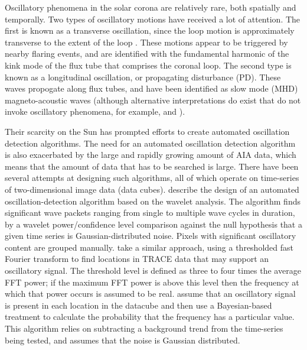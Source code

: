 \documentclass{aastex}
\begin{document}
Oscillatory phenomena in the solar corona are relatively rare, both
spatially and temporally.  Two types of oscillatory motions have
received a lot of attention.  The first is known as a transverse
oscillation, since the loop motion is approximately transverse to the
extent of the loop \citep{1999Sci...285..862N}.  These motions appear
to be triggered by nearby flaring events, and are identified with the
fundamental harmonic of the kink mode of the flux tube that comprises
the coronal loop.  The second type is known as a longitudinal
oscillation, or propagating disturbance (PD).  These waves propogate
along flux tubes, and have been identified as slow mode (MHD)
magneto-acoustic waves (although alternative interpretations do exist
that do not invoke oscillatory phenomena, for example,
\cite{0004-637X-722-2-1013} and \cite{2041-8205-727-2-L37}).

Their scarcity on the Sun has prompted efforts to create automated
oscillation detection algorithms.  The need for an automated
oscillation detection algorithm is also exacerbated by the large and
rapidly growing amount of AIA data, which means that the amount of
data that has to be searched is large.  There have been several
attempts at designing such algorithms, all of which operate on
time-series of two-dimensional image data (data cubes).
\cite{2004SoPh..223....1D} describe the design of an automated
oscillation-detection algorithm based on the wavelet analysis. The
algorithm finds significant wave packets ranging from single to
multiple wave cycles in duration, by a wavelet power/confidence level
comparison against the null hypothesis that a given time series is
Gaussian-distributed noise.  Pixels with significant oscillatory
content are grouped manually.  \cite{2007SoPh..241..397N} take a
similar approach, using a thresholded fast Fourier transform to find
locations in TRACE data that may support an oscillatory signal. The
threshold level is defined as three to four times the average FFT
power; if the maximum FFT power is above this level then the frequency
at which that power occurs is assumed to be real.
\cite{2010SoPh..264..403I} assume that an oscillatory signal is
present in each location in the datacube and then use a Bayesian-based
treatment to calculate the probability that the frequency has a
particular value.  This algorithm relies on subtracting a background
trend from the time-series being tested, and assumes that the noise is
Gaussian distributed.
\end{document}
